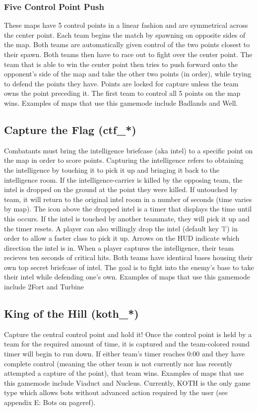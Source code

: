 \subsubsection{Five Control Point Push}
These maps have 5 control points in a linear fashion and are symmetrical across the center point. Each team begins the match by spawning on opposite sides of the map. Both teams are automatically given control of the two points closest to their spawn. Both teams then have to race out to fight over the center point. The team that is able to win the center point then tries to push forward onto the opponent's side of the map and take the other two points (in order), while trying to defend the points they have. Points are locked for capture unless the team owns the point preceding it. The first team to control all 5 points on the map wins. Examples of maps that use this gamemode include Badlands and Well.

\subsection{Capture the Flag (ctf\_*)}
Combatants must bring the intelligence briefcase (aka intel) to a specific point on the map in order to score points. Capturing the intelligence refers to obtaining the intelligence by touching it to pick it up and bringing it back to the intelligence room.  If the intelligence-carrier is killed by the opposing team, the intel is dropped on the ground at the point they were killed. If untouched by team, it will return to the original intel room in a number of seconds (time varies by map).  The icon above the dropped intel is a timer that displays the time until this occurs.  If the intel is touched by another teammate, they will pick it up and the timer resets. A player can also willingly drop the intel (default key 'l') in order to allow a faster class to pick it up. Arrows on the HUD indicate which direction the intel is in. When a player captures the intelligence, their team recieves ten seconds of critical hits. Both teams have identical bases housing their own top secret briefcase of intel.  The goal is to fight into the enemy's base to take their intel while defending one's own. Examples of maps that use this gamemode include 2Fort and Turbine

\subsection{King of the Hill (koth\_*)}
Capture the central control point and hold it!  Once the control point is held by a team for the required amount of time, it is captured and the team-colored round timer will begin to run down. If either team's timer reaches 0:00 and they have complete control (meaning the other team is not currently nor has recently attempted a capture of the point), that team wins. Examples of maps that use this gamemode include Viaduct and Nucleus. Currently, KOTH is the only game type which allows bots without advanced action required by the user (see appendix E: Bots on {{pageref}}).

